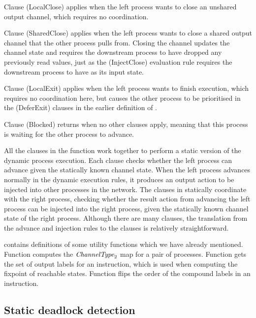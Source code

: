 Clause (LocalClose) applies when the left process wants to close an unshared output channel, which requires no coordination.

Clause (SharedClose) applies when the left process wants to close a shared output channel that the other process pulls from.
Closing the channel updates the channel state and requires the downstream process to have dropped any previously read values, just as the (InjectClose) evaluation rule requires the downstream process to have \lstiproc@none@ as its input state.

Clause (LocalExit) applies when the left process wants to finish execution, which requires no coordination here, but causes the other process to be prioritised in the (DeferExit) clauses in the earlier definition of .

Clause (Blocked) returns \lstiproc@Nothing@ when no other clauses apply, meaning that this process is waiting for the other process to advance.

All the clauses in the  function work together to perform a static version of the dynamic process execution.
Each clause checks whether the left process can advance given the statically known channel state.
When the left process advances normally in the dynamic execution rules, it produces an output action to be injected into other processes in the network.
The clauses in  statically coordinate with the right process, checking whether the result action from advancing the left process can be injected into the right process, given the statically known channel state of the right process.
Although there are many clauses, the translation from the advance and injection rules to the clauses is relatively straightforward.

\smallskip



 contains definitions of some utility functions which we have already mentioned.
Function  computes the $\textit{ChannelType}_2$ map for a pair of processes.
Function  gets the set of output labels for an instruction, which is used when computing the fixpoint of reachable states.
Function  flips the order of the compound labels in an instruction.

\subsection{Static deadlock detection}
\label{process/static-deadlock}

